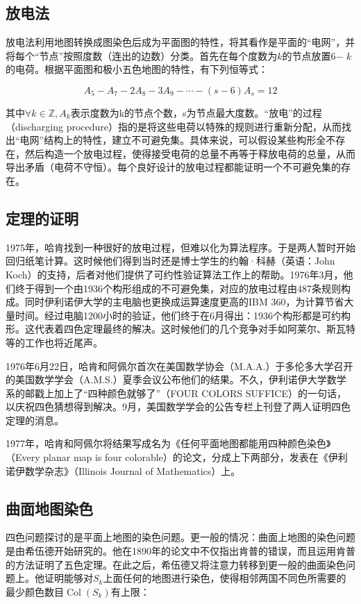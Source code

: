 \documentclass[12pt]{article} %
\begin{document}
\subsection{放电法}

放电法利用地图转换成图染色后成为平面图的特性，将其看作是平面的“电网”，并将每个“节点”按照度数（连出的边数）分类。首先在每个度数为$k$的节点放置6$-$ $k$的电荷。根据平面图和极小五色地图的特性，有下列恒等式：

\begin{equation}
\label{eqn:eqn1}
A_{5}-A_{7}-2 A_{8}-3 A_{9}-\cdots-(s-6) A_{s}=12
\end{equation}

其中$\forall k \in \mathbb{Z}, A_{k}$表示度数为k的节点个数，s为节点最大度数。“放电”的过程（discharging procedure）指的是将这些电荷以特殊的规则进行重新分配，从而找出“电网”结构上的特性，建立不可避免集。具体来说，可以假设某些构形全不存在，然后构造一个放电过程，使得接受电荷的总量不再等于释放电荷的总量，从而导出矛盾（电荷不守恒）。每个良好设计的放电过程都能证明一个不可避免集的存在\cite{JPM}。

\subsection{定理的证明}

1975年，哈肯找到一种很好的放电过程，但难以化为算法程序。于是两人暂时开始回归纸笔计算。这时候他们得到当时还是博士学生的约翰·科赫（英语：John Koch）的支持，后者对他们提供了可约性验证算法工作上的帮助。1976年3月，他们终于得到一个由1936个构形组成的不可避免集，对应的放电过程由487条规则构成\cite{GAY}。同时伊利诺伊大学的主电脑也更换成运算速度更高的IBM 360，为计算节省大量时间。经过电脑1200小时的验证，他们终于在6月得出：1936个构形都是可约构形。这代表着四色定理最终的解决。这时候他们的几个竞争对手如阿莱尔、斯瓦特等的工作也将近尾声。

1976年6月22日，哈肯和阿佩尔首次在美国数学协会（M.A.A.）于多伦多大学召开的美国数学学会（A.M.S.）夏季会议公布他们的结果。不久，伊利诺伊大学数学系的邮戳上加上了“四种颜色就够了”（FOUR COLORS SUFFICE）的一句话，以庆祝四色猜想得到解决\cite{GAY}\cite{POST}。9月，美国数学学会的公告专栏上刊登了两人证明四色定理的消息\cite{APPEL}。

1977年，哈肯和阿佩尔将结果写成名为《任何平面地图都能用四种颜色染色》（Every planar map is four colorable）的论文，分成上下两部分，发表在《伊利诺伊数学杂志》（Illinois Journal of Mathematics）上\cite{APPEL2}\cite{APPEL3}。

\subsection{曲面地图染色}
四色问题探讨的是平面上地图的染色问题。更一般的情况：曲面上地图的染色问题是由希伍德开始研究的。他在1890年的论文中不仅指出肯普的错误，而且运用肯普的方法证明了五色定理。在此之后，希伍德又将注意力转移到更一般的曲面染色问题上。他证明能够对$S_{k}$上面任何的地图进行染色，使得相邻两国不同色所需要的最少颜色数目$\operatorname{Col}\left(S_{k}\right)$有上限：
\end{document}
